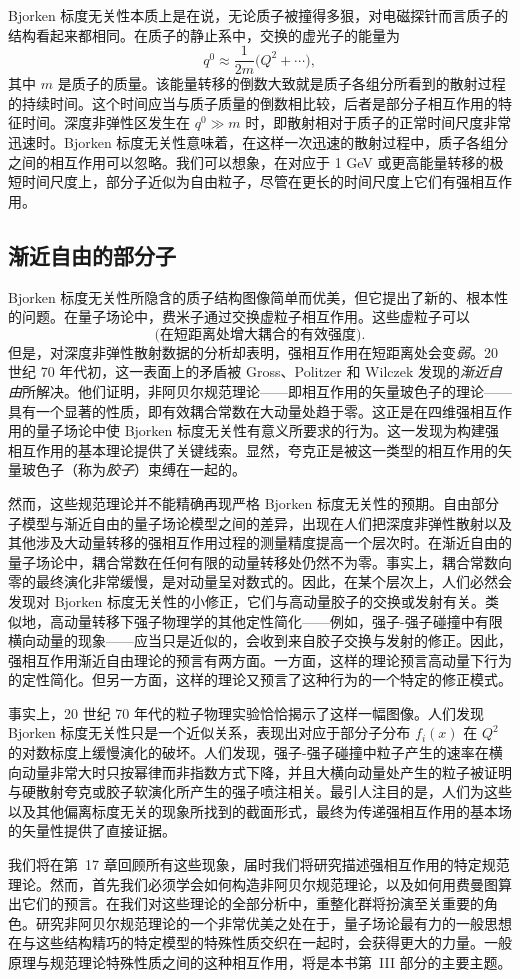 Bjorken 标度无关性本质上是在说，无论质子被撞得多狠，对电磁探针而言质子的结构看起来都相同。在质子的静止系中，交换的虚光子的能量为
\begin{equation}
  q^0 \approx \frac{1}{2m}\bigl( Q^2 + \cdots \bigr) ,
\end{equation}
其中 $m$ 是质子的质量。该能量转移的倒数大致就是质子各组分所看到的散射过程的持续时间。这个时间应当与质子质量的倒数相比较，后者是部分子相互作用的特征时间。深度非弹性区发生在 $q^0 \gg m$ 时，即散射相对于质子的正常时间尺度非常迅速时。Bjorken 标度无关性意味着，在这样一次迅速的散射过程中，质子各组分之间的相互作用可以忽略。我们可以想象，在对应于 1 GeV 或更高能量转移的极短时间尺度上，部分子近似为自由粒子，尽管在更长的时间尺度上它们有强相互作用。

\subsection*{渐近自由的部分子}

Bjorken 标度无关性所隐含的质子结构图像简单而优美，但它提出了新的、根本性的问题。在量子场论中，费米子通过交换虚粒子相互作用。这些虚粒子可以
\begin{equation}
  \text{(在短距离处增大耦合的有效强度)} .
\end{equation}
但是，对深度非弹性散射数据的分析却表明，强相互作用在短距离处会变\emph{弱}。20 世纪 70 年代初，这一表面上的矛盾被 Gross、Politzer 和 Wilczek 发现的\emph{渐近自由}所解决。他们证明，非阿贝尔规范理论——即相互作用的矢量玻色子的理论——具有一个显著的性质，即有效耦合常数在大动量处趋于零。这正是在四维强相互作用的量子场论中使 Bjorken 标度无关性有意义所要求的行为。这一发现为构建强相互作用的基本理论提供了关键线索。显然，夸克正是被这一类型的相互作用的矢量玻色子（称为\emph{胶子}）束缚在一起的。

然而，这些规范理论并不能精确再现严格 Bjorken 标度无关性的预期。自由部分子模型与渐近自由的量子场论模型之间的差异，出现在人们把深度非弹性散射以及其他涉及大动量转移的强相互作用过程的测量精度提高一个层次时。在渐近自由的量子场论中，耦合常数在任何有限的动量转移处仍然不为零。事实上，耦合常数向零的最终演化非常缓慢，是对动量呈对数式的。因此，在某个层次上，人们必然会发现对 Bjorken 标度无关性的小修正，它们与高动量胶子的交换或发射有关。类似地，高动量转移下强子物理学的其他定性简化——例如，强子-强子碰撞中有限横向动量的现象——应当只是近似的，会收到来自胶子交换与发射的修正。因此，强相互作用渐近自由理论的预言有两方面。一方面，这样的理论预言高动量下行为的定性简化。但另一方面，这样的理论又预言了这种行为的一个特定的修正模式。

事实上，20 世纪 70 年代的粒子物理实验恰恰揭示了这样一幅图像。人们发现 Bjorken 标度无关性只是一个近似关系，表现出对应于部分子分布 $f_i(x)$ 在 $Q^2$ 的对数标度上缓慢演化的破坏。人们发现，强子-强子碰撞中粒子产生的速率在横向动量非常大时只按幂律而非指数方式下降，并且大横向动量处产生的粒子被证明与硬散射夸克或胶子软演化所产生的强子喷注相关。最引人注目的是，人们为这些以及其他偏离标度无关的现象所找到的截面形式，最终为传递强相互作用的基本场的矢量性提供了直接证据。

我们将在第~17 章回顾所有这些现象，届时我们将研究描述强相互作用的特定规范理论。然而，首先我们必须学会如何构造非阿贝尔规范理论，以及如何用费曼图算出它们的预言。在我们对这些理论的全部分析中，重整化群将扮演至关重要的角色。研究非阿贝尔规范理论的一个非常优美之处在于，量子场论最有力的一般思想在与这些结构精巧的特定模型的特殊性质交织在一起时，会获得更大的力量。一般原理与规范理论特殊性质之间的这种相互作用，将是本书第~III 部分的主要主题。
